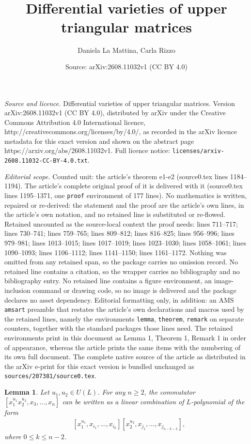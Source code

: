 \documentclass[10pt,a4paper]{amsart}
\title{Differential varieties of upper triangular matrices}
\author{Daniela La Mattina, Carla Rizzo}
\date{Source: arXiv:2608.11032v1 (CC BY 4.0)}
\newtheorem{lemma}{Lemma}
\begin{document}
\maketitle

\noindent\emph{Source and licence.} Differential varieties of upper triangular matrices. Version arXiv:2608.11032v1 (CC BY 4.0), distributed by arXiv under the Creative Commons Attribution 4.0 International licence, http://creativecommons.org/licenses/by/4.0/, as recorded in the arXiv licence metadata for this exact version and shown on the abstract page https://arxiv.org/abs/2608.11032v1. Full licence notice: \texttt{licenses/arxiv-2608.11032-CC-BY-4.0.txt}.\par\smallskip

\noindent\textit{Editorial scope.} Counted unit: the article's theorem e1-e2 (source0.tex lines 1184--1194). The article's complete original proof of it is delivered with it (source0.tex lines 1195--1371, one \texttt{proof} environment of 177 lines). No mathematics is written, repaired or re-derived: the statement and the proof are the article's own lines, in the article's own notation, and no retained line is substituted or re-flowed.  Retained uncounted as the source-local context the proof needs: lines 711--717; lines 730--741; lines 759--765; lines 809--812; lines 816--825; lines 956--996; lines 979--981; lines 1013--1015; lines 1017--1019; lines 1023--1030; lines 1058--1061; lines 1090--1093; lines 1106--1112; lines 1141--1150; lines 1161--1172.  Nothing was omitted from any retained span, so the package carries no omission record.  No retained line contains a citation, so the wrapper carries no bibliography and no bibliography entry.  No retained line contains a figure environment, an image-inclusion command or drawing code, so no image is delivered and the package declares no asset dependency.  Editorial formatting only, in addition: an AMS \texttt{amsart} preamble that restates the article's own declarations and macros used by the retained lines, namely the environments \texttt{lemma}, \texttt{theorem}, \texttt{remark} on separate counters, together with the standard packages those lines need.  The retained environments print in this document as Lemma 1, Theorem 1, Remark 1 in order of appearance, whereas the article prints the same items with the numbering of its own full document.  The complete native source of the article as distributed in the arXiv e-print for this exact version is bundled unchanged as \texttt{sources/207381/source0.tex}.
\begin{lemma}\label{lem: x_1^{u_1}x_2^{u_2}}
    Let $u_1, u_2\in U(L)$. For any $n\geq 2$, the commutator $[x_1^{u_{1}}x_2^{u_{2}}, x_3, \ldots, x_n]$ can be written as a linear combination of $L$-polynomial of the form 
    \begin{align*}
        &[x_{1}^{u_{1}},x_{i_1},\dots,x_{i_{k}}][x_{2}^{u_{2}},x_{j_1},\dots,x_{j_{n-k-2}}],
    \end{align*}
     where $0\leq k \leq n-2$. 
\end{lemma}
\end{document}
